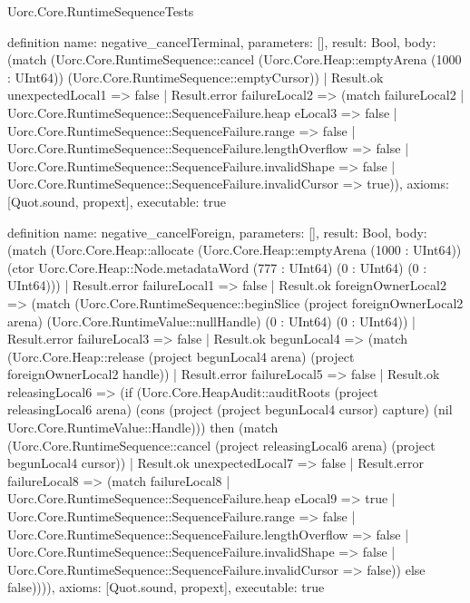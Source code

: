 \begin{lexlean}{Uorc.Core.RuntimeSequenceTests}
\begin{semanticmodule}
definition{
  name: negative_cancelTerminal,
  parameters: [],
  result: Bool,
  body: (match (Uorc.Core.RuntimeSequence::cancel (Uorc.Core.Heap::emptyArena (1000 : UInt64)) (Uorc.Core.RuntimeSequence::emptyCursor))
    | Result.ok unexpectedLocal1 => false
    | Result.error failureLocal2 => (match failureLocal2
      | Uorc.Core.RuntimeSequence::SequenceFailure.heap eLocal3 => false
      | Uorc.Core.RuntimeSequence::SequenceFailure.range => false
      | Uorc.Core.RuntimeSequence::SequenceFailure.lengthOverflow => false
      | Uorc.Core.RuntimeSequence::SequenceFailure.invalidShape => false
      | Uorc.Core.RuntimeSequence::SequenceFailure.invalidCursor => true)),
  axioms: [Quot.sound, propext],
  executable: true
}

definition{
  name: negative_cancelForeign,
  parameters: [],
  result: Bool,
  body: (match (Uorc.Core.Heap::allocate (Uorc.Core.Heap::emptyArena (1000 : UInt64)) (ctor Uorc.Core.Heap::Node.metadataWord (777 : UInt64) (0 : UInt64) (0 : UInt64)))
    | Result.error failureLocal1 => false
    | Result.ok foreignOwnerLocal2 => (match (Uorc.Core.RuntimeSequence::beginSlice (project foreignOwnerLocal2 arena) (Uorc.Core.RuntimeValue::nullHandle) (0 : UInt64) (0 : UInt64))
      | Result.error failureLocal3 => false
      | Result.ok begunLocal4 => (match (Uorc.Core.Heap::release (project begunLocal4 arena) (project foreignOwnerLocal2 handle))
        | Result.error failureLocal5 => false
        | Result.ok releasingLocal6 => (if (Uorc.Core.HeapAudit::auditRoots (project releasingLocal6 arena) (cons (project (project begunLocal4 cursor) capture) (nil Uorc.Core.RuntimeValue::Handle))) then (match (Uorc.Core.RuntimeSequence::cancel (project releasingLocal6 arena) (project begunLocal4 cursor))
          | Result.ok unexpectedLocal7 => false
          | Result.error failureLocal8 => (match failureLocal8
            | Uorc.Core.RuntimeSequence::SequenceFailure.heap eLocal9 => true
            | Uorc.Core.RuntimeSequence::SequenceFailure.range => false
            | Uorc.Core.RuntimeSequence::SequenceFailure.lengthOverflow => false
            | Uorc.Core.RuntimeSequence::SequenceFailure.invalidShape => false
            | Uorc.Core.RuntimeSequence::SequenceFailure.invalidCursor => false)) else false)))),
  axioms: [Quot.sound, propext],
  executable: true
}


\end{semanticmodule}
\end{lexlean}
